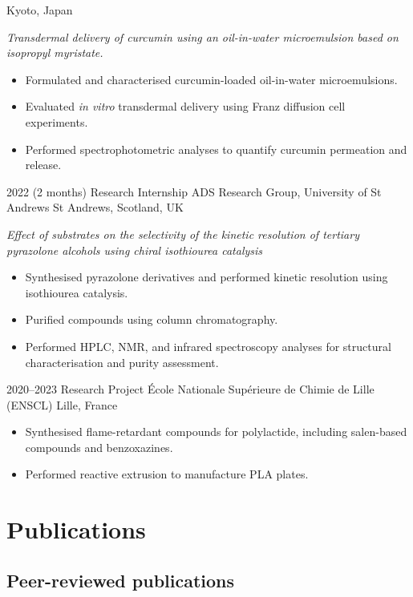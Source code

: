 \documentclass[11pt,a4paper,sans]{moderncv}
\begin{document}
{{Kyoto, Japan}
{}
{%
\emph{Transdermal delivery of curcumin using an oil-in-water microemulsion based on isopropyl myristate.}
\begin{itemize}[leftmargin=*,nosep]
    \item Formulated and characterised curcumin-loaded oil-in-water microemulsions.
    \item Evaluated \emph{in vitro} transdermal delivery using Franz diffusion cell experiments.
    \item Performed spectrophotometric analyses to quantify curcumin permeation and release.
\end{itemize}%
}
\cventry
{2022 (2 months)}
{Research Internship}
{ADS Research Group, University of St Andrews}
{St Andrews, Scotland, UK}
{}
{%
\emph{Effect of substrates on the selectivity of the kinetic resolution of tertiary pyrazolone alcohols using chiral isothiourea catalysis}
\begin{itemize}[leftmargin=*,nosep]
    \item Synthesised pyrazolone derivatives and performed kinetic resolution
    using isothiourea catalysis.
    \item Purified compounds using column chromatography.
    \item Performed HPLC, NMR, and infrared spectroscopy analyses for
    structural characterisation and purity assessment.
\end{itemize}%
}
\cventry
{2020--2023}
{Research Project}
{École Nationale Supérieure de Chimie de Lille (ENSCL)}
{Lille, France}
{}
{%
\begin{itemize}[leftmargin=*,nosep]
\item Synthesised flame-retardant compounds for polylactide, including salen-based compounds and benzoxazines.
\item Performed reactive extrusion to manufacture PLA plates.
\end{itemize}%
}
\section{Publications}

\subsection{Peer-reviewed publications}

}
\end{document}
